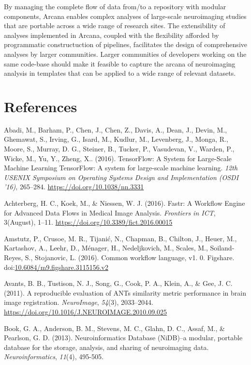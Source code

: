 By managing the complete flow of data from/to a repository with modular
components, Arcana enables complex analyses of large-scale neuroimaging
studies that are portable across a wide range of research sites. The
extensibility of analyses implemented in Arcana, coupled with the
flexibility afforded by programmatic constructuction of pipelines,
facilitates the design of comprehensive analyses by larger communities.
Larger communities of developers working on the same code-base should
make it feasible to capture the arcana of neuroimaging analysis in
templates that can be applied to a wide range of relevant datasets.

\hypertarget{references}{%
\section{References}\label{references}}

Abadi, M., Barham, P., Chen, J., Chen, Z., Davis, A., Dean, J., Devin,
M., Ghemawat, S., Irving, G., Isard, M., Kudlur, M., Levenberg, J.,
Monga, R., Moore, S., Murray, D. G., Steiner, B., Tucker, P., Vasudevan,
V., Warden, P., Wicke, M., Yu, Y., Zheng, X.. (2016). TensorFlow: A
System for Large-Scale Machine Learning TensorFlow: A system for
large-scale machine learning. \emph{12th USENIX Symposium on Operating
Systems Design and Implementation (OSDI '16)}, 265--284.
\href{https://doi.org/10.1038/nn.3331}{{https://doi.org/10.1038/nn.3331}}

Achterberg, H. C., Koek, M., \& Niessen, W. J. (2016). Fastr: A Workflow
Engine for Advanced Data Flows in Medical Image Analysis.
\emph{Frontiers in ICT}, 3(August), 1--11.
\href{https://doi.org/10.3389/fict.2016.00015}{{https://doi.org/10.3389/fict.2016.00015}}

Amstutz, P., Crusoe, M. R., Tijanić, N., Chapman, B., Chilton, J.,
Heuer, M., Kartashov, A., Leehr, D., Ménager, H., Nedeljkovich, M.,
Scales, M., Soiland-Reyes, S., Stojanovic, L. (2016). Common workflow
language, v1. 0. Figshare.
doi:\href{https://doi.org/10.6084/m9.figshare.3115156.v2}{{10.6084/m9.figshare.3115156.v2}}

Avants, B. B., Tustison, N. J., Song, G., Cook, P. A., Klein, A., \&
Gee, J. C. (2011). A reproducible evaluation of ANTs similarity metric
performance in brain image registration. \emph{NeuroImage},
\emph{54}(3), 2033--2044.
\href{https://doi.org/10.1016/J.NEUROIMAGE.2010.09.025}{{https://doi.org/10.1016/J.NEUROIMAGE.2010.09.025}}

Book, G. A., Anderson, B. M., Stevens, M. C., Glahn, D. C., Assaf, M.,
\& Pearlson, G. D. (2013). Neuroinformatics Database (NiDB)--a modular,
portable database for the storage, analysis, and sharing of neuroimaging
data. \emph{Neuroinformatics}, \emph{11}(4), 495-505.

